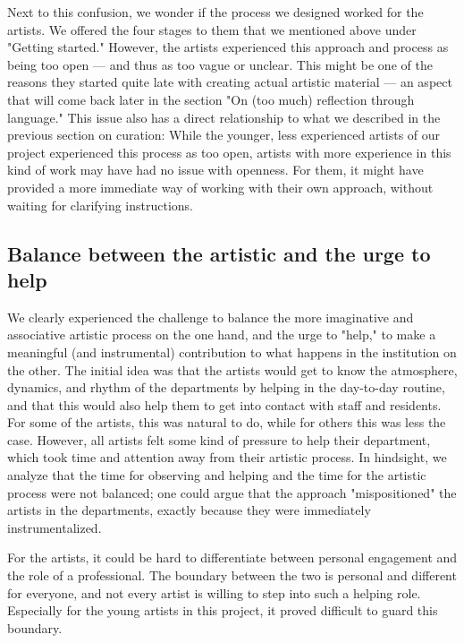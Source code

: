 \documentclass[authordate, empirical,issue]{jote-new-article}
\begin{document}
{	Next to this confusion, we wonder if the process we designed worked for the artists. We offered the four stages to them that we mentioned above under "Getting started." However, the artists experienced this approach and process as being too open --- and thus as too vague or unclear. This might be one of the reasons they started quite late with creating actual artistic material --- an aspect that will come back later in the section "On (too much) reflection through language." This issue also has a direct relationship to what we described in the previous section on curation: While the younger, less experienced artists of our project experienced this process as too open, artists with more experience in this kind of work may have had no issue with openness. For them, it might have provided a more immediate way of working with their own approach, without waiting for clarifying instructions.







	\subsection{Balance between the artistic and the urge to help}







	We clearly experienced the challenge to balance the more imaginative and associative artistic process on the one hand, and the urge to "help," to make a meaningful (and instrumental) contribution to what happens in the institution on the other. The initial idea was that the artists would get to know the atmosphere, dynamics, and rhythm of the departments by helping in the day-to-day routine, and that this would also help them to get into contact with staff and residents. For some of the artists, this was natural to do, while for others this was less the case. However, all artists felt some kind of pressure to help their department, which took time and attention away from their artistic process. In hindsight, we analyze that the time for observing and helping and the time for the artistic process were not balanced; one could argue that the approach "mispositioned" the artists in the departments, exactly because they were immediately instrumentalized.







	For the artists, it could be hard to differentiate between personal engagement and the role of a professional. The boundary between the two is personal and different for everyone, and not every artist is willing to step into such a helping role. Especially for the young artists in this project, it proved difficult to guard this boundary.







}
\end{document}
